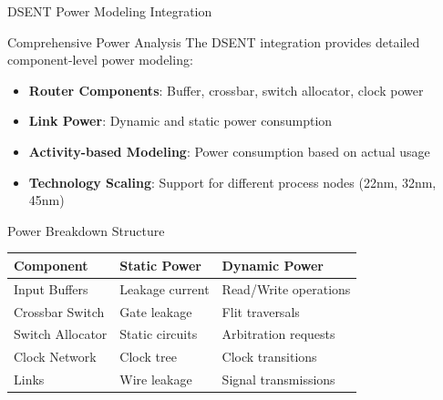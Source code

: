 \documentclass[10pt,aspectratio=169]{beamer}
\begin{document}
\begin{frame}{DSENT Power Modeling Integration}
    \begin{block}{Comprehensive Power Analysis}
        The DSENT integration provides detailed component-level power modeling:
        \begin{itemize}
            \item \textbf{Router Components}: Buffer, crossbar, switch allocator, clock power
            \item \textbf{Link Power}: Dynamic and static power consumption
            \item \textbf{Activity-based Modeling}: Power consumption based on actual usage
            \item \textbf{Technology Scaling}: Support for different process nodes (22nm, 32nm, 45nm)
        \end{itemize}
    \end{block}
    
    \begin{block}{Power Breakdown Structure}
        \begin{center}
        \scriptsize
        \begin{tabular}{|l|l|l|}
            \hline
            \textbf{Component} & \textbf{Static Power} & \textbf{Dynamic Power} \\
            \hline
            Input Buffers & Leakage current & Read/Write operations \\
            Crossbar Switch & Gate leakage & Flit traversals \\
            Switch Allocator & Static circuits & Arbitration requests \\
            Clock Network & Clock tree & Clock transitions \\
            Links & Wire leakage & Signal transmissions \\
            \hline
        \end{tabular}
        \end{center}
    \end{block}
\end{frame}
\end{document}
